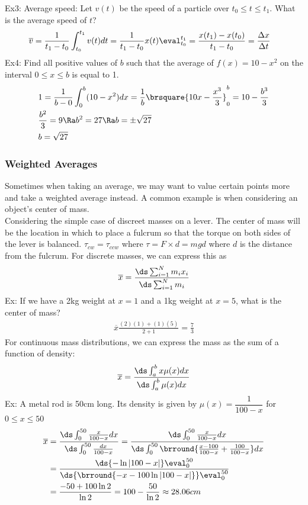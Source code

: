Ex3: Average speed: Let $v(t)$ be the speed of a particle over $t_0\leq t\leq t_1$. What is the average speed of $t$?
\begin{align*}
    &\overline{v}=\frac{1}{t_1-t_0}\int_{t_0}^{t_1}v(t)dt={\frac{1}{t_1-t_0}x(t)}\eval_{t_0}^{t_1}=\frac{x(t_1)-x(t_0)}{t_1-t_0}=\frac{\Delta x}{\Delta t}
\end{align*}
Ex4: Find all positive values of $b$ such that the average of $f(x)=10-x^2$ on the interval $0\leq x\leq b$ is equal to 1.
\begin{align*}
    &1=\frac{1}{b-0}\int_0^b(10-x^2)dx=\frac{1}{b}\brsquare{10x-\frac{x^3}{3}}_0^b=10-\frac{b^3}{3}\\
    &\frac{b^2}{3}=9\Ra b^2=27\Ra b=\pm\sqrt{27}\\
    &b=\sqrt{27}
\end{align*}
\subsubsection{Weighted Averages}
Sometimes when taking an average, we may want to value certain points more and take a weighted average instead. A common example is when considering an object's center of mass.\\
Considering the simple case of discreet masses on a lever. The center of mass will be the location in which to place a fulcrum so that the torque on both sides of the lever is balanced. $\tau_{cw}=\tau_{ccw}$ where $\tau=F\times d=mgd$ where $d$ is the distance from the fulcrum. For discrete masses, we can express this as
$$\overline{x}=\frac{\ds\sum_{i=1}^Nm_ix_i}{\ds\sum_{i=1}^Nm_i}$$
Ex: If we have a 2kg weight at $x=1$ and a 1kg weight at $x=5$, what is the center of mass?
\begin{align*}
    \overline{x}\frac{(2)(1)+(1)(5)}{2+1}=\frac{7}{3}
\end{align*}
For continuous mass distributions, we can express the mass as the sum of a function of density:
$$\overline{x}=\frac{\ds\int_a^bx\mu(x)dx}{\ds\int_a^b\mu(x)dx}$$
Ex: A metal rod is 50cm long. Its density is given by $\mu(x)=\dfrac{1}{100-x}$ for $0\leq x\leq 50$
\begin{align*}
    \overline{x}&=\frac{\ds\int_0^{50}\frac{x}{100-x}dx}{\ds\int_0^{50}\frac{dx}{100-x}}=\frac{\ds\int_0^{50}\frac{x}{100-x}dx}{\ds\int_0^{50}\brround{\frac{x-100}{100-x}+\frac{100}{100-x}}dx}\\
    &=\frac{\ds{-\ln|100-x|}\eval_0^{50}}{\ds{\brround{-x-100\ln|100-x|}}\eval_0^{50}}\\
    &=\frac{-50+100\ln 2}{\ln 2}=100-\frac{50}{\ln 2}\approx 28.06cm
\end{align*}
